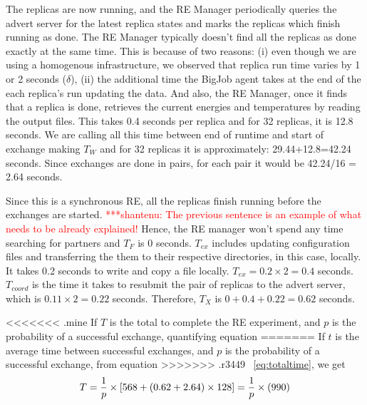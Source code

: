 \documentclass{rspublic}
\newcommand{\jhanote}[1]{ {\textcolor{red} { ***shantenu: #1 }}}
\newcommand{\jhanote}[1]{}
\begin{document}
The replicas are now running, and the RE Manager periodically queries
the advert server for the latest replica states and marks the replicas
which finish running as done. The RE Manager typically doesn't find
all the replicas as done exactly at the same time. This is because of
two reasons: (i) even though we are using a homogenous infrastructure,
we observed that replica run time varies by 1 or 2 seconds ($\delta$),
(ii) the additional time the BigJob agent takes at the end of the each
replica's run updating the data. And also, the RE Manager, once it
finds that a replica is done, retrieves the current energies and
temperatures by reading the output files. This takes 0.4 seconds per
replica and for 32 replicas, it is 12.8 seconds.  We are calling all
this time between end of runtime and start of exchange making $T_W$
and for 32 replicas it is approximately: 29.44+12.8=42.24
seconds. Since exchanges are done in pairs, for each pair it would be
42.24/16 = 2.64 seconds.

Since this is a synchronous RE, all the replicas finish running before
the exchanges are started. \jhanote{The previous sentence is an
  example of what needs to be already explained!}  Hence, the RE
manager won't spend any time searching for partners and $T_F$ is 0
seconds. $T_{ex}$ includes updating configuration files and
transferring the them to their respective directories, in this case,
locally. It takes 0.2 seconds to write and copy a file
locally. $T_{ex} = 0.2 \times 2=0.4$ seconds. $T_{coord}$ is the time
it takes to resubmit the pair of replicas to the advert server, which
is $0.11\times 2 = 0.22$ seconds. Therefore, $T_X$ is
$0+0.4+0.22=0.62$ seconds. 

<<<<<<< .mine
If $T$ is the total to complete the RE experiment, and $p$ is
the probability of a successful exchange, quantifying equation
=======
If $t$ is the average time between successful exchanges, and $p$ is
the probability of a successful exchange, from equation
>>>>>>> .r3449
~\ref{eq:totaltime}, we get
\begin{eqnarray}
T=  {1 \over p} \times {[ 568+ (0.62 + 2.64)\times 128]} = {1 \over p} \times (990)
\label{eq:timebt}
\end{eqnarray}
\end{document}
